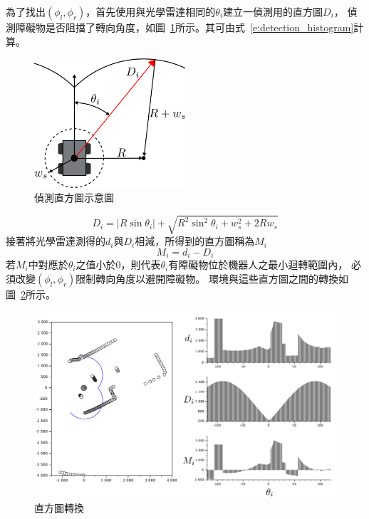 為了找出$(\phi_l,\phi_r)$，首先使用與光學雷達相同的$\theta_i$建立一偵測用的直方圖$D_i$，
偵測障礙物是否阻擋了轉向角度，如圖~\ref{f:detection_histogram}所示。其可由式~\ref{e:detection_histogram}計算。
\begin{figure}[h!]
	\centering
	\includegraphics[width=0.5\textwidth]{figures/algorithm/detection_histogram}
	\caption{偵測直方圖示意圖}
	\label{f:detection_histogram}
\end{figure}
\begin{equation}
	D_i = |R\sin\theta_i| + \sqrt{R^2\sin^2\theta_i + w_s^2 + 2Rw_s}
	\label{e:detection_histogram}
\end{equation}
接著將光學雷達測得的$d_i$與$D_i$相減，所得到的直方圖稱為$M_i$
\begin{equation}
	M_i = d_i - D_i
\end{equation}
若$M_i$中對應於$\theta_i$之值小於$0$，則代表$\theta_i$有障礙物位於機器人之最小迴轉範圍內，
必須改變$(\phi_l,\phi_r)$限制轉向角度以避開障礙物。
環境與這些直方圖之間的轉換如圖~\ref{f:histogram_transform}所示。
\begin{figure}[h!]
	\centering
	\includegraphics[width=\textwidth]{figures/algorithm/histogram_transform}
	\caption{直方圖轉換}
	\label{f:histogram_transform}
\end{figure}

